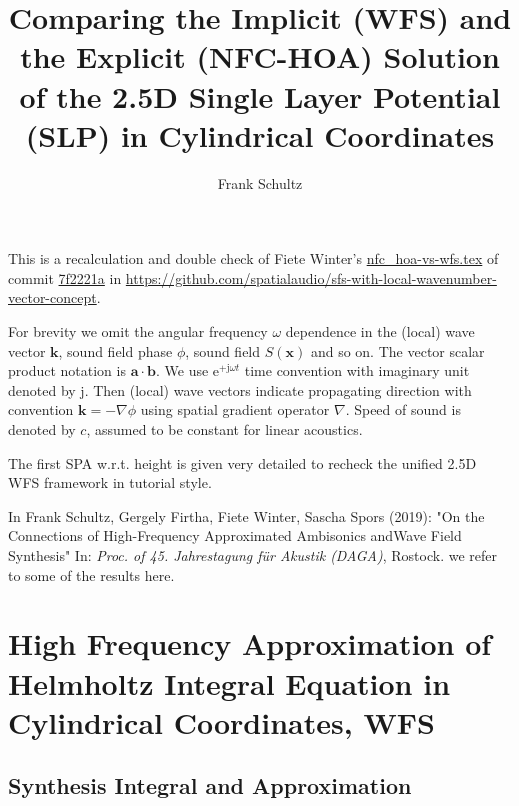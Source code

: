 \documentclass[a4paper,BCOR=15mm,10pt,twoside]{scrartcl}
\title{Comparing the Implicit (WFS) and the Explicit (NFC-HOA) Solution of the 
2.5D Single Layer Potential (SLP) in Cylindrical Coordinates}
\author{Frank Schultz}
\newcommand\e{\mathrm{e}}  %
\newcommand\im{\mathrm{j}}  %
\renewcommand{\vec}[1]{\mathbf{#1}}  %
\begin{document}
\maketitle
%
This is a recalculation and double check of Fiete Winter's \url{nfc_hoa-vs-wfs.tex} of commit \url{7f2221a} in \url{https://github.com/spatialaudio/sfs-with-local-wavenumber-vector-concept}.

For brevity we omit the angular frequency $\omega$ dependence in the (local) wave vector $\vec{k}$, sound field phase $\phi$, sound field $S(\vec{x})$ and so on. The vector scalar product notation is $\vec{a} \cdot \vec{b}$.
%
We use $\e^{+\im \omega t}$ time convention with imaginary unit denoted by $\im$.
%
Then (local) wave vectors indicate propagating direction with convention $\vec{k} = - \nabla \phi$ using spatial gradient operator $\nabla$. Speed of sound is denoted by $c$, assumed to be constant for linear acoustics.

The first SPA w.r.t. height is given very detailed to recheck the unified 2.5D WFS framework in tutorial style.

In Frank Schultz, Gergely Firtha, Fiete Winter, Sascha Spors (2019): 
"On the Connections of High-Frequency Approximated Ambisonics andWave Field Synthesis" In: \textit{Proc. of 45. Jahrestagung für Akustik (DAGA)}, Rostock.
we refer to some of the results here.

\section{High Frequency Approximation of Helmholtz Integral Equation in Cylindrical Coordinates, WFS}

\subsection{Synthesis Integral and Approximation}
\end{document}

